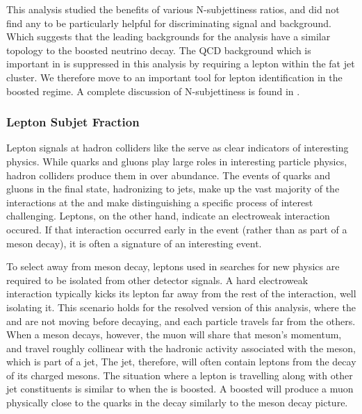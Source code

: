 This analysis studied the benefits of various N-subjettiness ratios, and did not find any to be particularly helpful for discriminating signal and background. Which suggests that the leading backgrounds for the analysis have a similar topology to the boosted neutrino decay. The QCD background which is important in \higgstobb is suppressed in this analysis by requiring a lepton within the fat jet cluster. We therefore move to an important tool for lepton identification in the boosted regime. A complete discussion of N-subjettiness is found in \cite{Nsubjettiness}.


\subsubsection{Lepton Subjet Fraction}

\label{sec:lsf}

Lepton signals at hadron colliders like the \LHC serve as clear indicators of interesting physics.  While quarks and gluons play large roles in interesting particle physics, hadron colliders produce them in over abundance.  The events of quarks and gluons in the final state, hadronizing to jets, make up the vast majority of the interactions at the \LHC and make distinguishing a specific process of interest challenging. Leptons, on the other hand, indicate an electroweak interaction occured. If that interaction occurred early in the event (rather than as part of a meson decay), it is often a signature of an interesting event.

To select away from meson decay, leptons used in searches for new physics are required to be isolated from other detector signals. A hard electroweak interaction typically kicks its lepton far away from the rest of the interaction, well isolating it. This scenario holds for the resolved version of this analysis, where the \NR and \WR are not moving before decaying, and each particle travels far from the others. When a meson decays, however, the muon will share that meson's momentum, and travel roughly collinear with the hadronic activity associated with the meson, which is part of a jet, The jet, therefore, will often contain leptons from the decay of its charged mesons. The situation where a lepton is travelling along with other jet constituents is similar to when the \NR is boosted. A boosted \NR will produce a muon physically close to the quarks in the \NR decay similarly to the meson decay picture.

